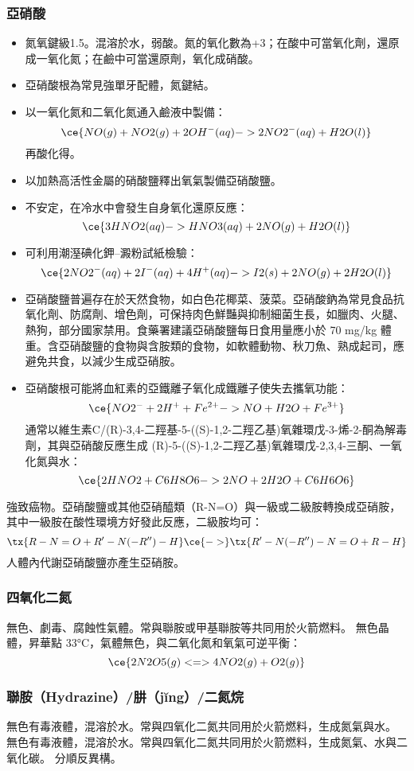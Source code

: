 \documentclass[a4paper,12pt]{report}
\begin{document}
\subsubsection{亞硝酸}
\begin{itemize}
\item 氮氧鍵級1.5。混溶於水，弱酸。氮的氧化數為+3；在酸中可當氧化劑，還原成一氧化氮；在鹼中可當還原劑，氧化成硝酸。
\item 亞硝酸根為常見強單牙配體，氮鍵結。
\item 以一氧化氮和二氧化氮通入鹼液中製備：
\[\ce{NO(g) + NO2(g) + 2OH^-(aq) -> 2NO2^-(aq) + H2O(l)}\]
再酸化得。
\item 以加熱高活性金屬的硝酸鹽釋出氧氣製備亞硝酸鹽。
\item 不安定，在冷水中會發生自身氧化還原反應：
\[\ce{3HNO2(aq) -> HNO3(aq) + 2NO(g) + H2O(l)}\]
\item 可利用潮溼碘化鉀–澱粉試紙檢驗：
\[\ce{2NO2^-(aq) + 2I^-(aq) + 4H^+(aq) -> I2(s) + 2NO(g) + 2H2O(l)}\]
\item 亞硝酸鹽普遍存在於天然食物，如白色花椰菜、菠菜。亞硝酸鈉為常見食品抗氧化劑、防腐劑、增色劑，可保持肉色鮮豔與抑制細菌生長，如臘肉、火腿、熱狗，部分國家禁用。食藥署建議亞硝酸鹽每日食用量應小於 70 mg/kg 體重。含亞硝酸鹽的食物與含胺類的食物，如軟體動物、秋刀魚、熟成起司，應避免共食，以減少生成亞硝胺。
\item 亞硝酸根可能將血紅素的亞鐵離子氧化成鐵離子使失去攜氧功能：
\[\ce{NO2^- + 2H^+ + Fe^{2+} -> NO + H2O + Fe^{3+}}\]
通常以維生素C/(R)-3,4-二羥基-5-((S)-1,2-二羥乙基)氧雜環戊-3-烯-2-酮為解毒劑，其與亞硝酸反應生成 (R)-5-((S)-1,2-二羥乙基)氧雜環戊-2,3,4-三酮、一氧化氮與水：
\[\ce{2HNO2 + C6H8O6 -> 2NO + 2H2O + C6H6O6}\]
\end{itemize}
強致癌物。亞硝酸鹽或其他亞硝醯類（R-N=O）與一級或二級胺轉換成亞硝胺，其中一級胺在酸性環境方好發此反應，二級胺均可：
\[\tx{R-N=O + R'-N(-R'')-H}\ce{->}\tx{R'-N(-R'')-N=O + R-H}\]
人體內代謝亞硝酸鹽亦產生亞硝胺。
\subsubsection{四氧化二氮}
無色、劇毒、腐蝕性氣體。常與聯胺或甲基聯胺等共同用於火箭燃料。
無色晶體，昇華點 33°C，氣體無色，與二氧化氮和氧氣可逆平衡：
\[\ce{2N2O5(g) <=> 4NO2(g) + O2(g)}\]
\subsubsection{聯胺（Hydrazine）/肼（jĭng）/二氮烷}
無色有毒液體，混溶於水。常與四氧化二氮共同用於火箭燃料，生成氮氣與水。
無色有毒液體，混溶於水。常與四氧化二氮共同用於火箭燃料，生成氮氣、水與二氧化碳。
分順反異構。
\end{document}
